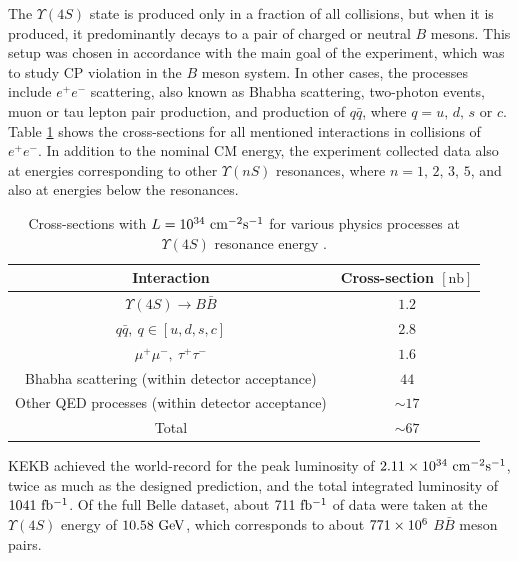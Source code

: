 The $\Upsilon(4S)$ state is produced only in a fraction of all collisions, but when it is produced, it predominantly decays to a pair of charged or neutral $B$ mesons. This setup was chosen in accordance with the main goal of the experiment, which was to study CP
violation in the $B$ meson system. In other cases, the processes include $e^+e^-$ scattering, also known as Bhabha scattering, two-photon events, muon or tau lepton pair production, and production of $q \bar q$, where $q=u,\,d,\,s$ or $c$. Table \ref{tab:xsec} shows the cross-sections for all mentioned interactions in collisions of $e^+e^-$.
In addition to the nominal CM energy, the experiment collected data also at energies
corresponding to other $\Upsilon(nS)$ resonances, where $n = 1,\,2,\,3,\,5$, and also at energies below the resonances.

\begin{table}[H]
	\centering
	\begin{tabular}{|c|c|}
		\hline
		Interaction & Cross-section $[\mathrm{nb}]$ \\ 
		\hline
		$\Upsilon(4S) \to B \bar B$ & $1.2$ \\
		$q \bar q,~q \in [u,d,s,c]$ & $2.8$ \\
		$\mu^+\mu^-,~\tau^+\tau^-$ & $1.6$ \\
		Bhabha scattering (within detector acceptance)& $44$ \\
		Other QED processes (within detector acceptance)& $\sim 17$ \\
		\hline
		Total & $\sim 67$ \\
		\hline
	\end{tabular}
	\caption{Cross-sections with $L=10^{34}\mathrm{~cm^{-2}s^{-1}}$ for various physics processes at $\Upsilon(4S)$ resonance energy \cite{ABASHIAN2002117}.}
	\label{tab:xsec}
\end{table}

KEKB achieved the world-record for the peak luminosity of $2.11\times 10^{34}\mathrm{~cm^{-2}s^{-1}}$, twice as much as the designed prediction, and the total integrated luminosity of $1041\mathrm{~fb^{-1}}$. Of the full Belle dataset, about $711\mathrm{~fb^{-1}}$ of data were taken at the $\Upsilon(4S)$ energy of $10.58\mathrm{~GeV}$, which corresponds to about $771\times 10^{6}$ $B \bar B$ meson pairs.

